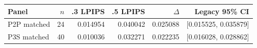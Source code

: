 {\small\setlength{\tabcolsep}{3pt}
\begin{tabular}{lrrrrr}
\hline
Panel & $n$ & .3 LPIPS & .5 LPIPS & $\Delta$ & Legacy 95\% CI \\
\hline
P2P matched & 24 & 0.014954 & 0.040042 & 0.025088 & [0.015525, 0.035879] \\
P3S matched & 40 & 0.010036 & 0.032271 & 0.022235 & [0.016028, 0.028862] \\
\hline
\end{tabular}
}

